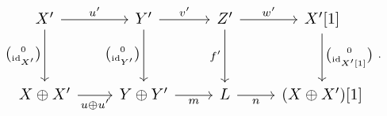 \begin{equation*}
  \resizebox{0.98\linewidth}{!}{%
    $\begin{tikzcd}[ampersand replacement=\&,column sep=2.25em,row sep=3.1em]
      X' \arrow[r,"{u'}"] \arrow[d,"{\binom{0}{\operatorname{id}_{X'}}}"']
        \& Y' \arrow[r,"{v'}"] \arrow[d,"{\binom{0}{\operatorname{id}_{Y'}}}"']
        \& Z' \arrow[r,"{w'}"] \arrow[d,"{f'}"']
        \& X'[1] \arrow[d,"{\binom{0}{\operatorname{id}_{X'[1]}}}"] \\
      X\oplus X' \arrow[r,"{u\oplus u'}"']
        \& Y\oplus Y' \arrow[r,"m"']
        \& L \arrow[r,"n"']
        \& (X\oplus X')[1]
    \end{tikzcd}$%
  }\,.
\end{equation*}
\endgroup
